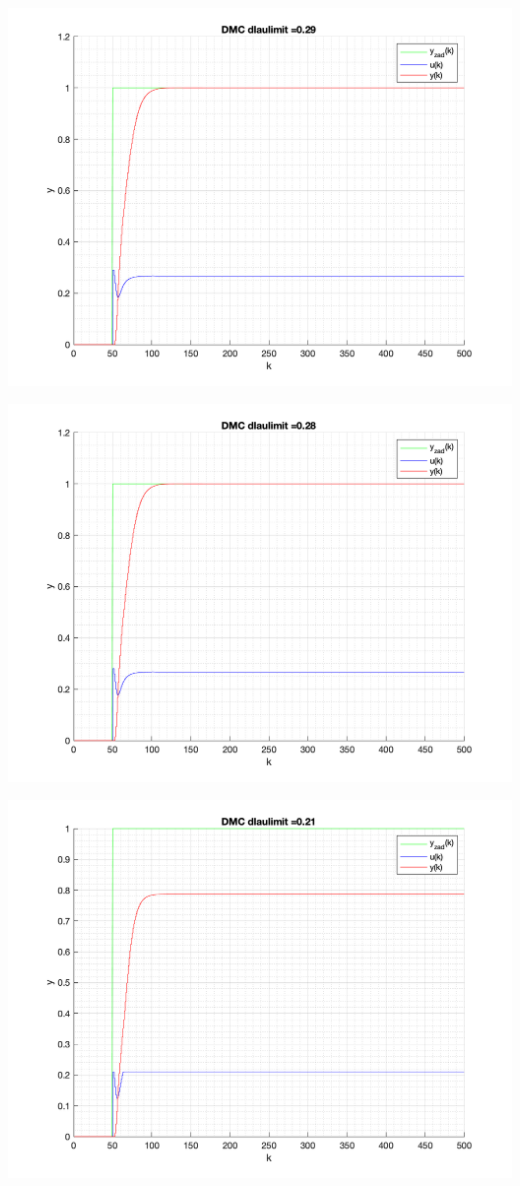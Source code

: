 \documentclass[a4paper, 11pt]{article}
\begin{document}
\begin{enumerate}
 \includegraphics[width=\linewidth]{./ModelsP6_ulimit/P4_DMC_ulimit_0_29_png.png} 
 
 \includegraphics[width=\linewidth]{./ModelsP6_ulimit/P4_DMC_ulimit_0_28_png.png} 
 
 \includegraphics[width=\linewidth]{./ModelsP6_ulimit/P4_DMC_ulimit_0_21_png.png} 
 

\end{enumerate}
\end{document}
